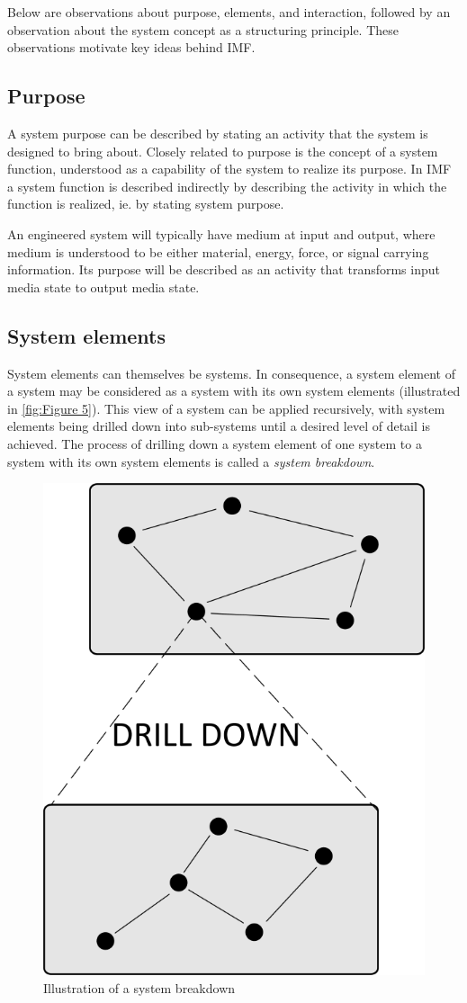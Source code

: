 \documentclass[../main.tex]{subfiles}
\begin{document}
Below are observations  about purpose, elements, and interaction, followed by an observation about the system concept as a structuring principle.  These observations motivate  key ideas behind  IMF. 

\subsection{Purpose}
A system purpose can be described by stating an activity that the system is designed to bring about.
Closely related to purpose is the concept of a system function, understood as 
a capability of the system to realize its purpose. In IMF a system function is described indirectly
by describing the activity in which the function is realized, ie. by
stating  system purpose.

An engineered system will typically have medium at input and output, where 
medium is understood to be either material, energy, force, or signal carrying information.
Its purpose will  be described as an activity that transforms 
input media state to output media state. 

\subsection{System elements}
System elements can themselves be systems. In consequence, a system element of a system may be considered as a system with its own system
elements (illustrated in \autoref{fig:Figure 5}). This view of a system can be applied recursively, with system elements being
drilled down into sub-systems until a desired level of detail is achieved. The process of drilling down a system
element of one system to a system with its own system elements is called a \emph{system breakdown}. 

\begin{figure}[htb]
  \centering
  \includegraphics[width=.3\textwidth]{img/IMFmanual-img005.png}
  \caption{Illustration of a system breakdown}
  \label{fig:Figure 5}
\end{figure}
\end{document}
